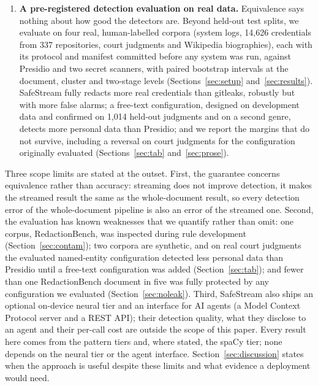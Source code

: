\begin{enumerate}
\item \textbf{A pre-registered detection evaluation on real data.} Equivalence says nothing about how good the detectors are. Beyond held-out test splits, we evaluate on four real, human-labelled corpora (system logs, 14,626 credentials from 337 repositories, court judgments and Wikipedia biographies), each with its protocol and manifest committed before any system was run, against Presidio and two secret scanners, with paired bootstrap intervals at the document, cluster and two-stage levels (Sections~\ref{sec:setup} and~\ref{sec:results}). SafeStream fully redacts more real credentials than gitleaks, robustly but with more false alarms; a free-text configuration, designed on development data and confirmed on 1,014 held-out judgments and on a second genre, detects more personal data than Presidio; and we report the margins that do not survive, including a reversal on court judgments for the configuration originally evaluated (Sections~\ref{sec:tab} and~\ref{sec:prose}).
\end{enumerate}

Three scope limits are stated at the outset. First, the guarantee concerns equivalence rather than accuracy: streaming does not improve detection, it makes the streamed result the same as the whole-document result, so every detection error of the whole-document pipeline is also an error of the streamed one. Second, the evaluation has known weaknesses that we quantify rather than omit: one corpus, RedactionBench, was inspected during rule development (Section~\ref{sec:contam}); two corpora are synthetic, and on real court judgments the evaluated named-entity configuration detected less personal data than Presidio until a free-text configuration was added (Section~\ref{sec:tab}); and fewer than one RedactionBench document in five was fully protected by any configuration we evaluated (Section~\ref{sec:noleak}). Third, SafeStream also ships an optional on-device neural tier and an interface for AI agents (a Model Context Protocol server and a REST API); their detection quality, what they disclose to an agent and their per-call cost are outside the scope of this paper. Every result here comes from the pattern tiers and, where stated, the spaCy tier; none depends on the neural tier or the agent interface. Section~\ref{sec:discussion} states when the approach is useful despite these limits and what evidence a deployment would need.
